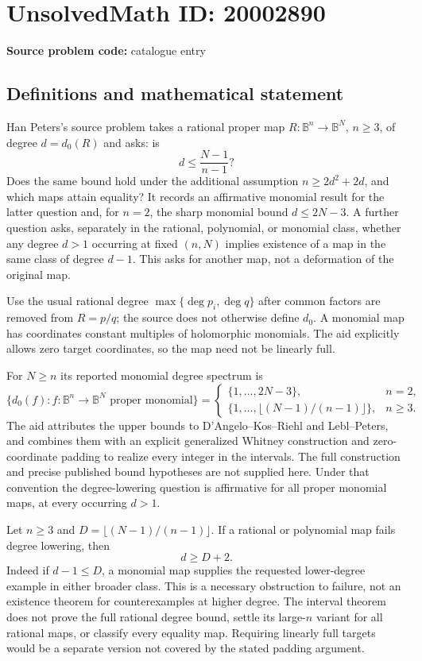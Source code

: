 \documentclass[11pt]{article}
\begin{document}
\section*{UnsolvedMath ID: 20002890}
\textbf{Source problem code:} catalogue entry
\subsection{Definitions and mathematical statement}
Han Peters's source problem takes a rational proper map $R:\mathbb B^n\to\mathbb B^N$, $n\ge3$, of degree $d=d_0(R)$ and asks: is
\[
 d\le\frac{N-1}{n-1}?
\]
Does the same bound hold under the additional assumption $n\ge2d^2+2d$, and which maps attain equality? It records an affirmative monomial result for the latter question and, for $n=2$, the sharp monomial bound $d\le2N-3$. A further question asks, separately in the rational, polynomial, or monomial class, whether any degree $d>1$ occurring at fixed $(n,N)$ implies existence of a map in the same class of degree $d-1$. This asks for another map, not a deformation of the original map.

Use the usual rational degree $\max\{\deg p_i,\deg q\}$ after common factors are removed from $R=p/q$; the source does not otherwise define $d_0$. A monomial map has coordinates constant multiples of holomorphic monomials. The aid explicitly allows zero target coordinates, so the map need not be linearly full.

For $N\ge n$ its reported monomial degree spectrum is
\[
 \{d_0(f):f:\mathbb B^n\to\mathbb B^N\text{ proper monomial}\}
 =\begin{cases}
 \{1,\ldots,2N-3\},&n=2,\\
 \{1,\ldots,\lfloor(N-1)/(n-1)\rfloor\},&n\ge3.
 \end{cases}
\]
The aid attributes the upper bounds to D'Angelo--Kos--Riehl and Lebl--Peters, and combines them with an explicit generalized Whitney construction and zero-coordinate padding to realize every integer in the intervals. The full construction and precise published bound hypotheses are not supplied here. Under that convention the degree-lowering question is affirmative for all proper monomial maps, at every occurring $d>1$.

Let $n\ge3$ and $D=\lfloor(N-1)/(n-1)\rfloor$. If a rational or polynomial map fails degree lowering, then
\[
 d\ge D+2.
\]
Indeed if $d-1\le D$, a monomial map supplies the requested lower-degree example in either broader class. This is a necessary obstruction to failure, not an existence theorem for counterexamples at higher degree. The interval theorem does not prove the full rational degree bound, settle its large-$n$ variant for all rational maps, or classify every equality map. Requiring linearly full targets would be a separate version not covered by the stated padding argument.
\end{document}
